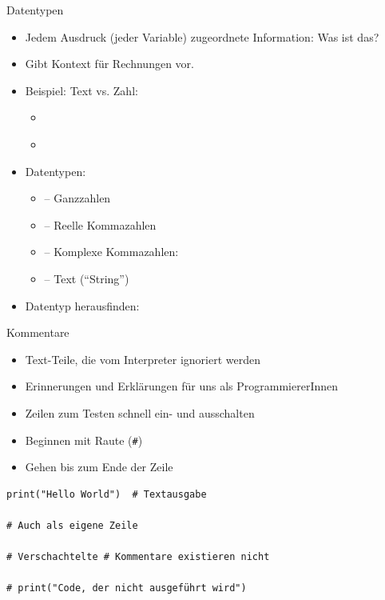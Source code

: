 \begin{frame}{Datentypen}
%
\begin{itemize}
\item Jedem Ausdruck (\zB jeder Variable) zugeordnete Information: Was ist das?
\item Gibt Kontext für Rechnungen vor.
\item Beispiel: Text vs. Zahl:
	\begin{itemize}
	\item {} \thus~ 
	\item {} \thus~ 
	\end{itemize}
\item Datentypen:
	\begin{itemize}
	\item {} -- Ganzzahlen
	\item {} -- Reelle Kommazahlen
	\item {} -- Komplexe Kommazahlen: 
	\item {} -- Text (\enquote{String})
	\end{itemize}
\item Datentyp herausfinden: 
\end{itemize}
%
\end{frame}


\begin{frame}[fragile]{Kommentare}
%
\begin{minipage}[t]{.44\linewidth}
\begin{itemize}
\item Text-Teile, die vom Interpreter ignoriert werden
\item Erinnerungen und Erklärungen für uns als ProgrammiererInnen
\item Zeilen zum Testen schnell ein- und ausschalten
\item Beginnen mit Raute (\texttt{\#})
\item Gehen bis zum Ende der Zeile
\end{itemize}
\end{minipage}
%
\begin{minipage}[t]{.55\linewidth}
\phantom{x}
\begin{codebox}
\begin{verbatim}
print("Hello World")  # Textausgabe

# Auch als eigene Zeile

# Verschachtelte # Kommentare existieren nicht

# print("Code, der nicht ausgeführt wird")
\end{verbatim}
\end{codebox}
\end{minipage}
%
\end{frame}
